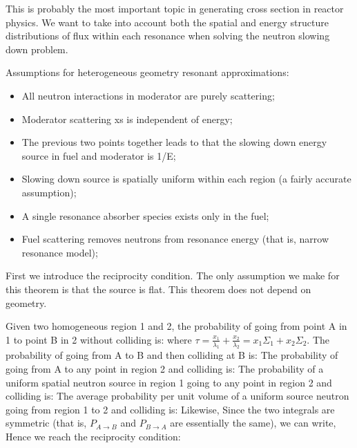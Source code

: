 \documentclass{school-22.211-notes}
\date{March  5, 2012}
\begin{document}
\maketitle

This is probably the most important topic in generating cross section in reactor physics. We want to take into account both the spatial and energy structure distributions of flux within each resonance when solving the neutron slowing down problem. 

Assumptions for heterogeneous geometry resonant approximations:
\begin{itemize}
\item All neutron interactions in moderator are purely scattering;
\item Moderator scattering xs is independent of energy;
\item The previous two points together leads to that the slowing down energy source in fuel and moderator is 1/E;
\item Slowing down source is spatially uniform within each region (a fairly accurate assumption);
\item A single resonance absorber species exists only in the fuel;
\item Fuel scattering removes neutrons from resonance energy (that is, narrow resonance model); 
\end{itemize}

First we introduce the reciprocity condition. The only assumption we make for this theorem is that the source is flat. This theorem does not depend on geometry. 

Given two homogeneous region 1 and 2, the probability of going from point A in 1 to point B in 2 without colliding is:
where $\tau = \frac{x_1}{\lambda_1} + \frac{x_2}{\lambda_2} = x_1 \Sigma_1 + x_2 \Sigma_2$. The probability of going from A to B and then colliding at B is: 
The probability of going from A to any point in region 2 and colliding is:
The probability of a uniform spatial neutron source in region 1 going to any point in region 2 and colliding is:
The average probability per unit volume of a uniform source neutron going from region 1 to 2 and colliding is:
Likewise,
Since the two integrals are symmetric (that is, $P_{A\to B}$ and $P_{B \to A}$ are essentially the same), we can write,
Hence we reach the reciprocity condition:
\end{document}
